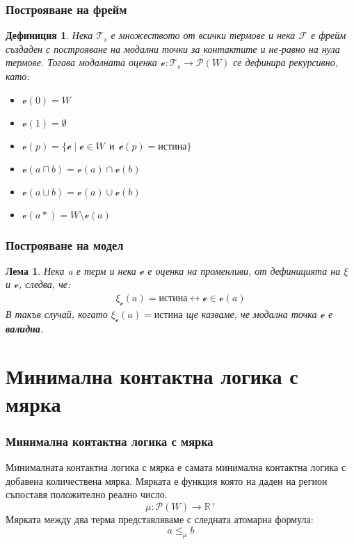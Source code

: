 \documentclass{beamer}
\newtheorem{defn}{Дефиниция}[section]
\newtheorem{lema}{Лема}[section]
\newcommand{\curvedE}{\mathscr{e}}
\newcommand{\vE}{\mathscr{v}}
\newcommand{\vBool}{\xi}
\newcommand{\Ts}{\mathcal{T}_s}
\begin{document}
\begin{frame}\frametitle{Построяване на фрейм}
	\begin{defn}
		Нека $\Ts$ е множеството от всички термове и нека $\mathcal{F}$ е фрейм създаден с построяване на модални точки за контактите и не-равно на нула термове.
		Тогава модалната оценка $\vE : \Ts \rightarrow \mathscr{P}(W)$ се дефинира рекурсивно, като:
		\begin{itemize}
			\item $\vE(0) = W$
			\item $\vE(1) = \emptyset$
			\item $\vE(p) = \{ \curvedE \; | \; \curvedE \in W \:\:\textit{и}\:\: \curvedE(p) = \textit{истина} \}$
			\item $\vE(a \sqcap b) = \vE(a) \cap \vE(b)$
			\item $\vE(a \sqcup b) = \vE(a) \cup \vE(b)$
			\item $\vE(a*) = W \setminus \vE(a)$
		\end{itemize}
	\end{defn}
\end{frame}

\begin{frame}\frametitle{Построяване на модел}
	\begin{lema}
		Нека a е терм и нека $\curvedE$ е оценка на променливи, от дефиницията на $\vBool$ и $\vE$, следва, че:
		\begin{align*}
			\vBool_{\curvedE}(a) = истина \leftrightarrow \curvedE \in \vE(a)
		\end{align*}
		В такъв случай, когато $\vBool_{\curvedE}(a) = \textbf{истина}$ ще казваме, че модална точка  $\curvedE$ е \textbf{валидна}.
	\end{lema}
\end{frame}

\section{Минимална контактна логика с мярка}
\begin{frame}\frametitle{Минимална контактна логика с мярка}
Минималната контактна логика с мярка е самата минимална контактна логика с добавена количествена мярка.
\newline
\newline
Мярката е функция която на даден на регион съпоставя положително реално число.
\begin{equation*}
	\mu : \mathscr{P}(W) \longrightarrow \mathbb{R}^+
\end{equation*}
Мярката между два терма представляваме с следната атомарна формула:
	\begin{equation*} 
		a \le_\mu b
	\end{equation*}
\end{frame}
\end{document}
